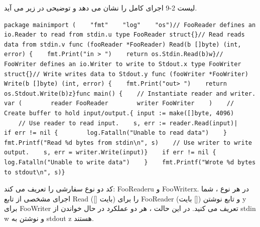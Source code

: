 \documentclass[12pt]{book}
\begin{document}
لیست 2-9 اجرای کامل را نشان می دهد و توضیحی در زیر می آید.
\begin{latin}
	\begin{lstlisting}[caption={A reader and writer demonstration (https://github.com/blackhat-go/bhg/ch-2/io-example/main.go/)},captionpos=b]
	package mainimport (    "fmt"    "log"    "os")// FooReader defines an io.Reader to read from stdin.u type FooReader struct{}// Read reads data from stdin.v func (fooReader *FooReader) Read(b []byte) (int, error) {    fmt.Print("in > ")    return os.Stdin.Read(b)w}// FooWriter defines an io.Writer to write to Stdout.x type FooWriter struct{}// Write writes data to Stdout.y func (fooWriter *FooWriter) Write(b []byte) (int, error) {    fmt.Print("out> ")    return os.Stdout.Write(b)z}func main() {    // Instantiate reader and writer.    var (        reader FooReader        writer FooWriter    )    // Create buffer to hold input/output.{ input := make([]byte, 4096)
	// Use reader to read input.    s, err := reader.Read(input)|    if err != nil {        log.Fatalln("Unable to read data")    }    fmt.Printf("Read %d bytes from stdin\n", s)    // Use writer to write output.    s, err = writer.Write(input)}    if err != nil {        log.Fatalln("Unable to write data")    }    fmt.Printf("Wrote %d bytes to stdout\n", s)}
	\end{lstlisting}
\end{latin}

کد دو نوع سفارشی را تعریف می کند: FooReaderu و FooWriterx. در هر نوع ، شما اجرای مشخصی از تابع Read ([] بایت) را برای FooReader و تابع نوشتن ([] بایت) y برای FooWriter تعریف می کنید. در این حالت ، هر دو عملکرد در حال خواندن از stdin w و نوشتن به stdout z هستند.
\end{document}
